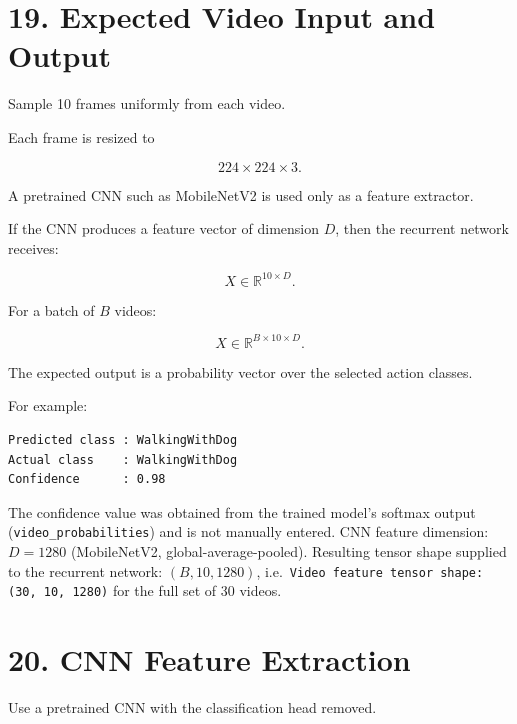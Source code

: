 \documentclass[10pt]{article}
\begin{document}
\section*{19. Expected Video Input and Output}

Sample 10 frames uniformly from each video.

Each frame is resized to

\[
224\times224\times3.
\]

A pretrained CNN such as MobileNetV2 is used only as a feature extractor.

If the CNN produces a feature vector of dimension $D$, then the recurrent
network receives:

\[
X\in\mathbb{R}^{10\times D}.
\]

For a batch of $B$ videos:

\[
X\in\mathbb{R}^{B\times10\times D}.
\]

The expected output is a probability vector over the selected action classes.

For example:

\begin{verbatim}
Predicted class : WalkingWithDog
Actual class    : WalkingWithDog
Confidence      : 0.98
\end{verbatim}

The confidence value was obtained from the trained model's softmax output
(\texttt{video\_probabilities}) and is not manually entered. CNN feature
dimension: $D = 1280$ (MobileNetV2, global-average-pooled). Resulting tensor
shape supplied to the recurrent network: $(B, 10, 1280)$, i.e.\
\texttt{Video feature tensor shape: (30, 10, 1280)} for the full set of 30
videos.

\section*{20. CNN Feature Extraction}

Use a pretrained CNN with the classification head removed.

\begin{center}
\end{center}
\end{document}
